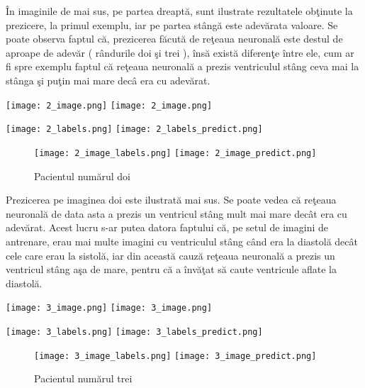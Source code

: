 \^{I}n imaginile de mai sus, pe partea dreapt\u{a}, sunt ilustrate rezultatele ob\c{t}inute la prezicere, la primul exemplu, iar pe partea st\^{a}ng\u{a} este adev\u{a}rata valoare. Se poate observa faptul c\u{a}, prezicerea f\u{a}cut\u{a} de re\c{t}eaua neuronal\u{a} este destul de aproape de adev\u{a}r ( r\^{a}ndurile doi \c{s}i trei ), \^{i}ns\u{a} exist\u{a} diferen\c{t}e \^{i}ntre ele, cum ar fi spre exemplu faptul c\u{a} re\c{t}eaua neuronal\u{a} a prezis ventriculul st\^{a}ng ceva mai la st\^{a}nga \c{s}i pu\c{t}in mai mare dec\^{a} era cu adev\u{a}rat.

\begin{center}
\texttt{[image: 2\_image.png]}
\texttt{[image: 2\_image.png]}
\end{center}

\begin{center}
\texttt{[image: 2\_labels.png]}
\texttt{[image: 2\_labels\_predict.png]}
\end{center}

\begin{figure}[h!]
  \center
  \texttt{[image: 2\_image\_labels.png]}
\texttt{[image: 2\_image\_predict.png]}
  \caption{Pacientul num\u{a}rul doi}
\end{figure}

Prezicerea pe imaginea doi este ilustrat\u{a} mai sus. Se poate vedea c\u{a} re\c{t}eaua neuronal\u{a} de data asta a prezis un ventricul st\^{a}ng mult mai mare dec\^{a}t era cu adev\u{a}rat. Acest lucru s-ar putea datora faptului c\u{a}, pe setul de imagini de antrenare, erau mai multe imagini cu ventriculul st\^{a}ng c\^{a}nd era la diastol\u{a} dec\^{a}t cele care erau la sistol\u{a}, iar din aceast\u{a} cauz\u{a} re\c{t}eaua neuronal\u{a} a prezis un ventricul st\^{a}ng a\c{s}a de mare, pentru c\u{a} a \^{i}nv\u{a}\c{t}at s\u{a} caute ventricule aflate la diastol\u{a}.

\begin{center}
\texttt{[image: 3\_image.png]}
\texttt{[image: 3\_image.png]}
\end{center}

\begin{center}
\texttt{[image: 3\_labels.png]}
\texttt{[image: 3\_labels\_predict.png]}
\end{center}

\begin{figure}[h!]
  \center
  \texttt{[image: 3\_image\_labels.png]}
\texttt{[image: 3\_image\_predict.png]}
  \caption{Pacientul num\u{a}rul trei}
\end{figure}

